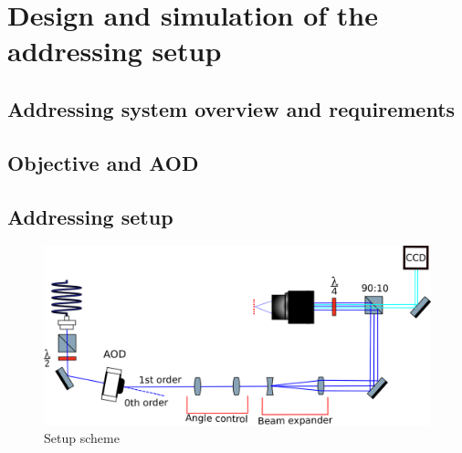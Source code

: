 
\chapter{Design and simulation of the addressing setup}
\section{Addressing system overview and requirements}
\section{Objective and AOD}
\section{Addressing setup}

\begin{figure}[H]
\centering
\includegraphics[width=\textwidth]{img/setup}
\caption{Setup scheme}
\end{figure}


